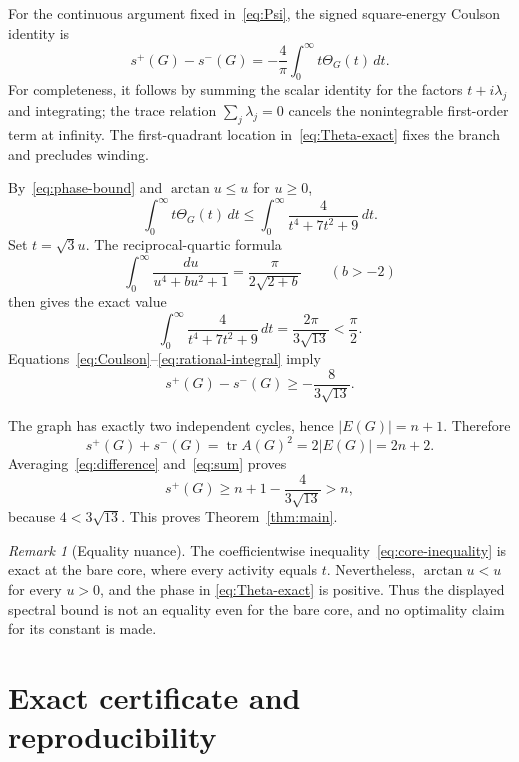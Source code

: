 \documentclass[11pt]{article}
\theoremstyle{remark}
\newtheorem{remark}[theorem]{Remark}
\newcommand{\tr}{\operatorname{tr}}
\begin{document}
For the continuous argument fixed in~\eqref{eq:Psi}, the signed
square-energy Coulson identity is
\begin{equation}\label{eq:Coulson}
 s^+(G)-s^-(G)
 =-\frac4\pi\int_0^\infty t\Theta_G(t)\,dt.
\end{equation}
For completeness, it follows by summing the scalar identity for the factors
$t+i\lambda_j$ and integrating; the trace relation
$\sum_j\lambda_j=0$ cancels the nonintegrable first-order term at infinity.
The first-quadrant location in~\eqref{eq:Theta-exact} fixes the branch and
precludes winding.

By~\eqref{eq:phase-bound} and $\arctan u\leq u$ for $u\geq0$,
\begin{equation}\label{eq:integral-bound}
 \int_0^\infty t\Theta_G(t)\,dt
 \leq\int_0^\infty\frac{4}{t^4+7t^2+9}\,dt.
\end{equation}
Set $t=\sqrt3u$.  The reciprocal-quartic formula
\[
 \int_0^\infty\frac{du}{u^4+bu^2+1}
 =\frac{\pi}{2\sqrt{2+b}}
 \qquad(b>-2)
\]
then gives the exact value
\begin{equation}\label{eq:rational-integral}
 \int_0^\infty\frac{4}{t^4+7t^2+9}\,dt
 =\frac{2\pi}{3\sqrt{13}}<\frac\pi2.
\end{equation}
Equations~\eqref{eq:Coulson}--\eqref{eq:rational-integral} imply
\begin{equation}\label{eq:difference}
 s^+(G)-s^-(G)\geq-\frac{8}{3\sqrt{13}}.
\end{equation}

The graph has exactly two independent cycles, hence $|E(G)|=n+1$.  Therefore
\begin{equation}\label{eq:sum}
 s^+(G)+s^-(G)=\tr A(G)^2=2|E(G)|=2n+2.
\end{equation}
Averaging~\eqref{eq:difference} and~\eqref{eq:sum} proves
\[
 s^+(G)\geq n+1-\frac{4}{3\sqrt{13}}>n,
\]
because $4<3\sqrt{13}$.  This proves Theorem~\ref{thm:main}.

\begin{remark}[Equality nuance]
The coefficientwise inequality~\eqref{eq:core-inequality} is exact at the bare
core, where every activity equals $t$.  Nevertheless,
$\arctan u<u$ for every $u>0$, and the phase in
\eqref{eq:Theta-exact} is positive.  Thus the displayed spectral bound is not
an equality even for the bare core, and no optimality claim for its constant
is made.
\end{remark}

\appendix
\section{Exact certificate and reproducibility}\label{app:certificate}
\end{document}
